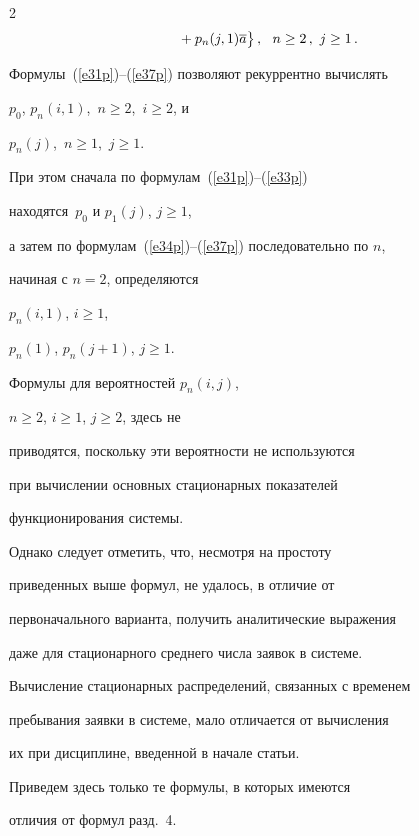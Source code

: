 \begin{multicols}{2}
\begin{align}
&\hspace*{20pt}{}+ p_{n}(j,1) \a \big\}\,,\ \ 


n\ge 2\,,\  j\ge 1\,.                   \label{e37p}


\end{align}


Формулы~(\ref{e31p})--(\ref{e37p}) позволяют рекуррентно вы\-чис\-лять


$p_0$, $p_{n}(i,1)$,\  $n\ge 2$,\  $i\ge 2$, и


$p_n(j)$,\ $n\ge 1$,\ $j\ge 1$.


При этом сначала по формулам~(\ref{e31p})--(\ref{e33p}) 


находятся~$p_0$ и $p_{1}(j)$, $j\ge 1$,


а затем по формулам~(\ref{e34p})--(\ref{e37p}) последовательно по $n$,


начиная с $n=2$, определяются


$p_{n}(i,1)$, $i\ge 1$,


$p_{n}(1)$, $p_n(j+1)$, $j\ge 1$.





Формулы для вероятностей $p_{n}(i,j)$,


$n\ge 2$, $i\ge 1$, $j\ge 2$, здесь не


приводятся, поскольку эти вероятности не используются


при вычислении основных стационарных показателей


функционирования сис\-темы.





Однако следует отметить, что, несмотря на прос\-то\-ту


приведенных выше формул, не удалось, в от\-личие от


первоначального варианта, получить аналитические выражения


даже для стационарного среднего числа заявок в системе.





Вычисление стационарных распределений, связанных с временем


пребывания заявки в системе, мало отличается от вычисления


их при дисциплине, введенной в начале статьи.


Приведем здесь только те формулы, в которых имеются


отличия от формул разд.~4.






\end{multicols}

